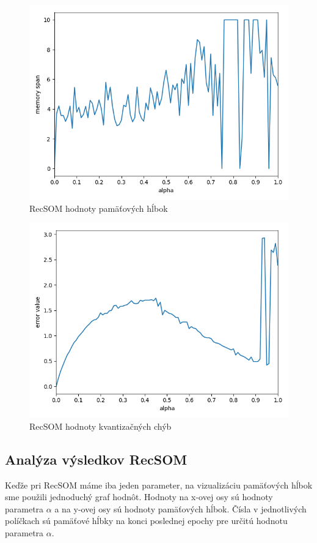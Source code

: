     \begin{figure}[H]
        \centering
        \includegraphics[width=\textwidth]{assets/recsom_memory_span}
        \caption{RecSOM hodnoty pamäťových hĺbok}
    \end{figure}
    
    \begin{figure}[H]
        \centering
        \includegraphics[width=\textwidth]{assets/recsom_errors}
        \caption{RecSOM hodnoty kvantizačných chýb}
    \end{figure}

\subsection{Analýza výsledkov RecSOM}
Keďže pri RecSOM máme iba jeden parameter, na vizualizáciu pamäťových hĺbok sme použili jednoduchý graf hodnôt.
Hodnoty na x-ovej osy sú hodnoty parametra $\alpha$  a na y-ovej osy sú hodnoty pamäťových hĺbok. 
Čísla v jednotlivých políčkach sú pamäťové hĺbky na konci poslednej epochy pre určitú hodnotu parametra $\alpha$.

